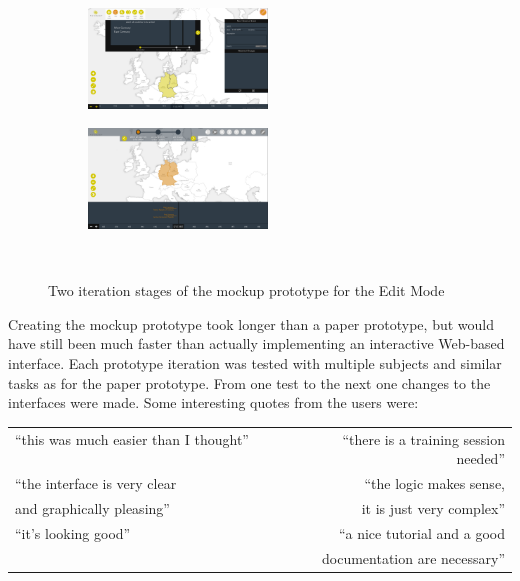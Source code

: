 \begin{figure}[ht]
  \centering
  \begin{subfigure}[b]{.5\textwidth}
    \centering
    \includegraphics[width=180px]{graphics/development/design_process/mockup_prototype_1.png}
  \end{subfigure}%
  \begin{subfigure}[b]{.5\textwidth}
    \centering
    \includegraphics[width=180px]{graphics/development/design_process/mockup_prototype_3.png}
  \end{subfigure} \\[0.8em]

  \caption{Two iteration stages of the mockup prototype for the Edit Mode}
  \label{fig:mockup_prototypes}
\end{figure}

Creating the mockup prototype took longer than a paper prototype, but would have still been much faster than actually implementing an interactive Web-based interface. Each prototype iteration was tested with multiple subjects and similar tasks as for the paper prototype. From one test to the next one changes to the interfaces were made. Some interesting quotes from the users were:

\begin{quoteit}
  \begin{tabular}{l r}
    ``this was much easier than I thought'' ~~~~~~~~ &
    ``there is a training session needed'' \\[0.5em]
    ``the interface is very clear &
    ``the logic makes sense, \\
    and graphically pleasing'' &
    it is just very complex'' \\[0.5em]
    ``it's looking good'' &
    ``a nice tutorial and a good \\
    & documentation are necessary'' \\
  \end{tabular}
\end{quoteit}

